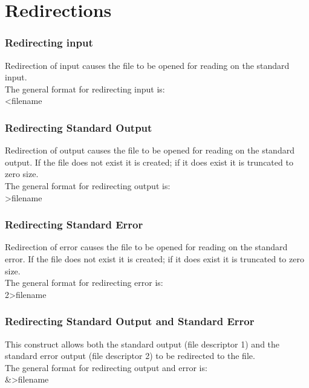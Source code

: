 \documentclass[12pt,a4paper]{report}
\begin{document}
\part{Redirections}
\setcounter{chapter}{1}
\section*{Redirecting input}
Redirection of input causes the file to be opened for reading on the standard input.\\
\newline
The general format for redirecting input is:\\
\newline
\hspace*{7 mm}<filename
\section*{Redirecting Standard Output}
Redirection of output causes the file to be opened for reading on the standard output. If the file does not exist it is created; if it does exist it is truncated to zero size.\\
\newline
The general format for redirecting output is:\\
\newline
\hspace*{7 mm}>filename
\section*{Redirecting Standard Error}
Redirection of error causes the file to be opened for reading on the standard error. If the file does not exist it is created; if it does exist it is truncated to zero size.\\
\newline
The general format for redirecting error is:\\
\newline
\hspace*{7 mm}2>filename
\section*{Redirecting Standard Output and Standard Error}
This  construct  allows both the standard output (file descriptor 1) and the standard error output (file descriptor 2) to be redirected to the file.\\
\newline
The general format for redirecting output and error is:\\
\newline
\hspace*{7 mm}\&>filename
\end{document}
